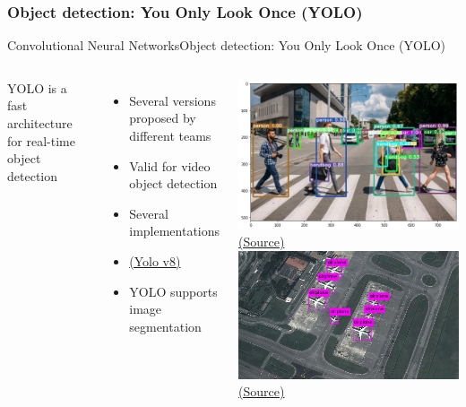 \documentclass[10pt,compress]{beamer} %
\begin{document}
\subsubsection{Object detection: You Only Look Once (YOLO)}
\begin{frame}{Convolutional Neural Networks}{Object detection: You Only Look Once (YOLO)}
    \begin{columns}
	YOLO is a fast architecture for real-time object detection
	\begin{itemize}
		\item Several versions proposed by different teams
		\item Valid for video object detection
		\item Several implementations
		\item \href{https://github.com/ultralytics/ultralytics}{(Yolo v8)}
		\item YOLO supports image segmentation
	\end{itemize}

        \centering \includegraphics[width=\textwidth]{figs/yolo-pedestrians.png}\\
	\scriptsize\href{https://neptune.ai/blog/object-detection-with-yolo-hands-on-tutorial}{(Source)}\\

        \includegraphics[width=\textwidth]{figs/yolov3.jpg}\\
	\scriptsize\href{https://github.com/yoyotv/YOLO-project}{(Source)}\\
    \end{columns}
\end{frame}
\end{document}
